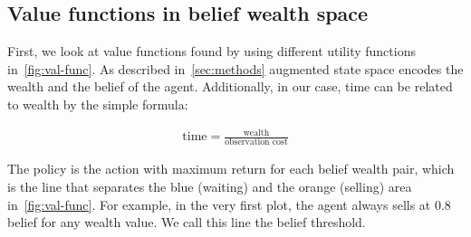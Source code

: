 \subsection{Value functions in belief wealth space}\label{ssec:val-func}

First, we look at value functions found by using different utility functions in~\autoref{fig:val-func}.
As described in~\autoref{sec:methods} augmented state space encodes the wealth and the belief of the agent. 
Additionally, in our case, time can be related to wealth by the simple formula:

\begin{align*}
\text{time} = \frac{\text{wealth}}{\text{observation\ cost}}
\end{align*}

The policy is the action with maximum return for each belief wealth pair, which is the line that separates the blue (waiting) and the orange (selling) area in~\autoref{fig:val-func}. For example, in the very first plot, the agent always sells at 0.8 belief for any wealth value. We call this line the belief threshold.

